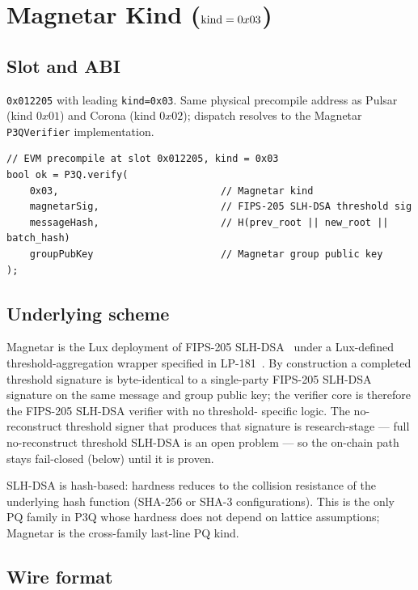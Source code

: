 \section{Magnetar Kind ($\textnormal{kind} = 0x03$)}
\label{sec:magnetar-kind}

\subsection{Slot and ABI}

\texttt{0x012205} with leading \texttt{kind=0x03}. Same physical
precompile address as Pulsar (kind $0x01$) and Corona
(kind $0x02$); dispatch resolves to the Magnetar
\texttt{P3QVerifier} implementation.

\begin{lstlisting}[language={}]
// EVM precompile at slot 0x012205, kind = 0x03
bool ok = P3Q.verify(
    0x03,                            // Magnetar kind
    magnetarSig,                     // FIPS-205 SLH-DSA threshold sig
    messageHash,                     // H(prev_root || new_root || batch_hash)
    groupPubKey                      // Magnetar group public key
);
\end{lstlisting}

\subsection{Underlying scheme}

Magnetar is the Lux deployment of FIPS-205 SLH-DSA~\cite{fips205}
under a Lux-defined threshold-aggregation wrapper specified in
LP-181~\cite{lp181}. By construction a completed threshold
signature is byte-identical to a single-party FIPS-205 SLH-DSA
signature on the same message and group public key; the verifier
core is therefore the FIPS-205 SLH-DSA verifier with no threshold-
specific logic. The no-reconstruct threshold signer that produces
that signature is research-stage --- full no-reconstruct threshold
SLH-DSA is an open problem --- so the on-chain path stays
fail-closed (below) until it is proven.

SLH-DSA is hash-based: hardness reduces to the collision
resistance of the underlying hash function (SHA-256 or SHA-3
configurations). This is the only PQ family in P3Q whose
hardness does not depend on lattice assumptions; Magnetar is
the cross-family last-line PQ kind.

\subsection{Wire format}

